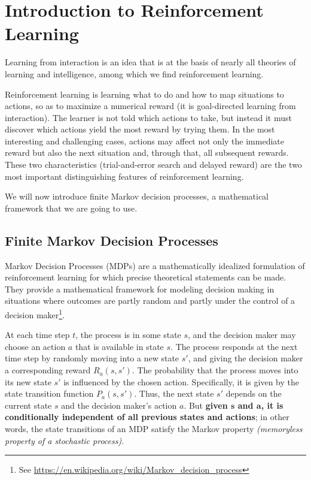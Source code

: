\chapter{Introduction to Reinforcement Learning}
Learning from interaction is an idea that is at the basis of nearly all theories of learning and intelligence, among which we find reinforcement learning.

Reinforcement learning is learning what to do and how to map situations to actions, so as to maximize a numerical reward (it is goal-directed learning from interaction). The learner is not told which actions to take, but instead it must discover which actions yield the most reward by trying them. In the most interesting and challenging cases, actions may affect not only the immediate reward but also the next situation and, through that, all subsequent rewards. These two characteristics (trial-and-error search and delayed reward) are the two most important distinguishing features of reinforcement learning.

We will now introduce finite Markov decision processes, a mathematical framework that we are going to use.

\section{Finite Markov Decision Processes}
Markov Decision Processes (MDPs) are a mathematically idealized formulation of reinforcement learning for which precise theoretical statements can be made. They provide a mathematical framework for modeling decision making in situations where outcomes are partly random and partly under the control of a decision maker\footnote{See \url{https://en.wikipedia.org/wiki/Markov_decision_process}}.

At each time step $t$, the process is in some state $s$, and the decision maker may choose an action $a$ that is available in state $s$. The process responds at the next time step by randomly moving into a new state $s'$, and giving the decision maker a corresponding reward $R_a(s,s')$. The probability that the process moves into its new state $s'$ is influenced by the chosen action. Specifically, it is given by the state transition function $P_a(s,s')$. Thus, the next state $s'$ depends on the current state $s$ and the decision maker's action $a$. But \textbf{given $\boldsymbol{s}$ and $\boldsymbol{a}$, it is conditionally independent of all previous states and actions}; in other words, the state transitions of an MDP satisfy the Markov property \textit{(memoryless property of a stochastic process)}.


